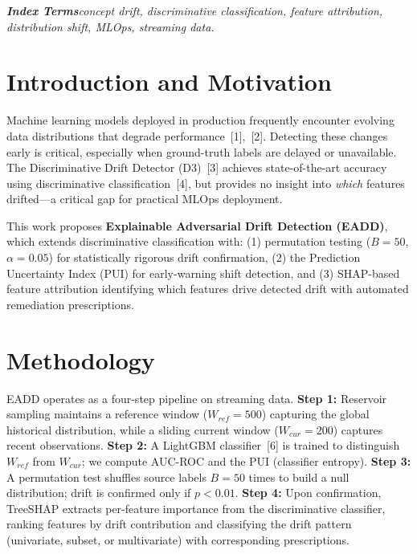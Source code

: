 \documentclass[10pt,twocolumn,a4paper]{article}
\begin{document}
\vspace{6pt}

\noindent\textbf{\textit{Index Terms}}\textemdash\textit{concept drift, discriminative classification, feature attribution, distribution shift, MLOps, streaming data.}

\vspace{12pt}

\section{Introduction and Motivation}

Machine learning models deployed in production frequently encounter evolving data distributions that degrade performance~[1],~[2]. Detecting these changes early is critical, especially when ground-truth labels are delayed or unavailable. The Discriminative Drift Detector (D3)~[3] achieves state-of-the-art accuracy using discriminative classification~[4], but provides no insight into \textit{which} features drifted---a critical gap for practical MLOps deployment.

This work proposes \textbf{Explainable Adversarial Drift Detection (EADD)}, which extends discriminative classification with: (1) permutation testing ($B{=}50$, $\alpha{=}0.05$) for statistically rigorous drift confirmation, (2) the Prediction Uncertainty Index (PUI) for early-warning shift detection, and (3) SHAP-based feature attribution identifying which features drive detected drift with automated remediation prescriptions.

\section{Methodology}

EADD operates as a four-step pipeline on streaming data. \textbf{Step 1:} Reservoir sampling maintains a reference window ($W_{ref}{=}500$) capturing the global historical distribution, while a sliding current window ($W_{cur}{=}200$) captures recent observations. \textbf{Step 2:} A LightGBM classifier~[6] is trained to distinguish $W_{ref}$ from $W_{cur}$; we compute AUC-ROC and the PUI (classifier entropy). \textbf{Step 3:} A permutation test shuffles source labels $B{=}50$ times to build a null distribution; drift is confirmed only if $p < 0.01$. \textbf{Step 4:} Upon confirmation, TreeSHAP extracts per-feature importance from the discriminative classifier, ranking features by drift contribution and classifying the drift pattern (univariate, subset, or multivariate) with corresponding prescriptions.
\end{document}
